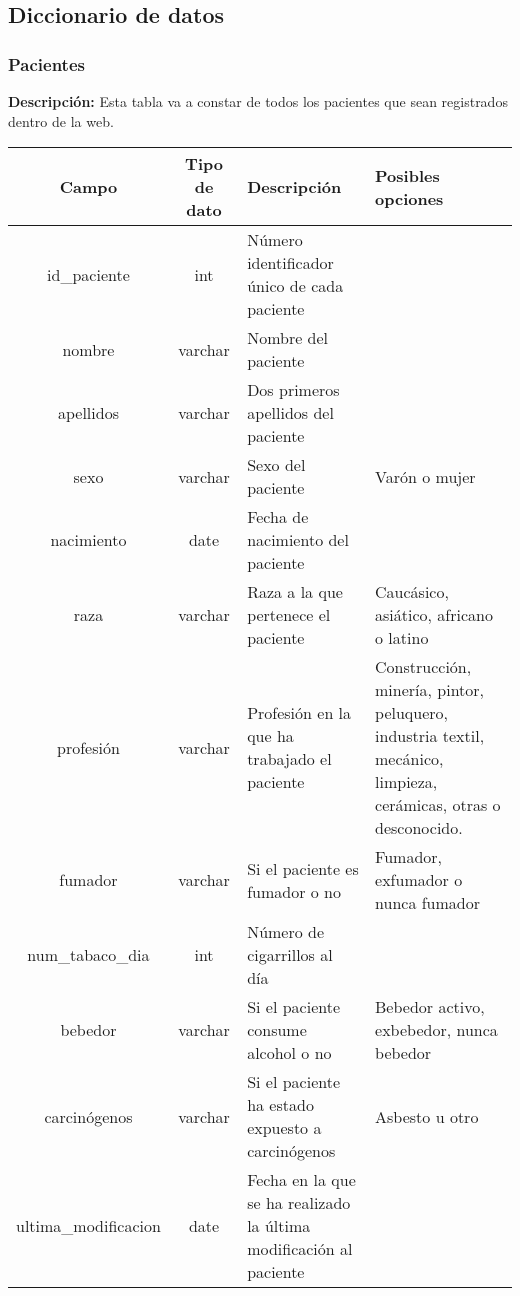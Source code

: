 
\subsection{Diccionario de datos}

\subsubsection{Pacientes}

\textbf{Descripción:} Esta tabla va a constar de todos los pacientes que sean registrados dentro de la web.

\begin{longtable}{|c |c |p{4cm} |p{3cm} |}
\hline
Campo & Tipo de dato & Descripción & Posibles opciones\\ \hline
id\_paciente & int & Número identificador único de cada paciente &\\ \hline
nombre & varchar & Nombre del paciente &\\ \hline
apellidos & varchar & Dos primeros apellidos del paciente &\\ \hline
sexo & varchar & Sexo del paciente & Varón o mujer\\  \hline
nacimiento & date & Fecha de nacimiento del paciente &\\ \hline
raza & varchar & Raza a la que pertenece el paciente & Caucásico, asiático, africano o latino\\ \hline
profesión & varchar & Profesión en la que ha trabajado el paciente & Construcción, minería, pintor, peluquero, industria textil, mecánico, limpieza, cerámicas, otras o desconocido. \\ \hline
fumador & varchar & Si el paciente es fumador o no & Fumador, exfumador o nunca fumador\\ \hline
num\_tabaco\_dia & int & Número de cigarrillos al día & \\ \hline
bebedor & varchar & Si el paciente consume alcohol o no & Bebedor activo, exbebedor, nunca bebedor\\ \hline
carcinógenos & varchar & Si el paciente ha estado expuesto a carcinógenos & Asbesto u otro  \\\hline
ultima\_modificacion & date & Fecha en la que se ha realizado la última modificación al paciente &  \\\hline
\end{longtable}

